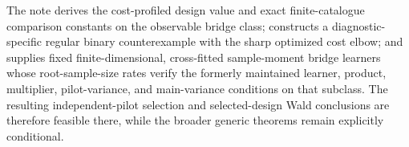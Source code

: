 The note derives the cost-profiled design value and exact finite-catalogue comparison constants on the observable bridge class; constructs a diagnostic-specific regular binary counterexample with the sharp optimized cost elbow; and supplies fixed finite-dimensional, cross-fitted sample-moment bridge learners whose root-sample-size rates verify the formerly maintained learner, product, multiplier, pilot-variance, and main-variance conditions on that subclass.  The resulting independent-pilot selection and selected-design Wald conclusions are therefore feasible there, while the broader generic theorems remain explicitly conditional.